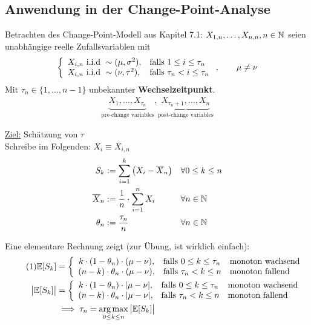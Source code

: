 \subsection{Anwendung in der Change-Point-Analyse} %
Betrachten des Change-Point-Modell aus Kapitel 7.1:
$X_{1,n},\ldots,X_{n,n},n\in\mathbb{N}$ seien unabhängige reelle Zufallsvariablen mit 
\begin{align*}
	\left\lbrace\begin{array}{ll}
		X_{i,n}\text{ i.i.d }\sim(\mu,\sigma^2), &\text{falls } 1\leq i\leq\tau_n\\
		X_{i,n}\text{ i.i.d }\sim(\nu,\tau^2), &\text{falls } \tau_n< i\leq\tau_n\\
	\end{array}\right.,\qquad\mu\neq\nu
\end{align*}
Mit $\tau_n\in\big\lbrace1,\ldots,n-1\big\rbrace$ unbekannter \textbf{Wechselzeitpunkt}.
\begin{align*}
	\underbrace{X_1,\ldots,X_{\tau_n}}_{\text{pre-change variables}},\underbrace{X_{\tau_n+1},\ldots,X_n}_{\text{post-change variables}}
\end{align*}

\underline{Ziel:} Schätzung von $\tau$\\
Schreibe im Folgenden: $X_i\equiv X_{i,n}$
\begin{align*}
	S_k&:=\sum\limits_{i=1}^k\big(X_i-\overline{X}_n\big) &\forall& 0\leq k\leq n\\
	\overline{X}_n&:=\frac{1}{n}\cdot\sum\limits_{i=1}^n X_i &\forall& n\in\mathbb{N}\\
	\theta_n&:=\frac{\tau_n}{n} &\forall& n\in\mathbb{N}
\end{align*}

Eine elementare Rechnung zeigt (zur Übung, ist wirklich  einfach):
\begin{align}\label{eqUnder8.2_1}\tag{1}
	\mathbb{E}[S_k]
	&=\left\lbrace\begin{array}{cll}
		k\cdot(1-\theta_n)\cdot(\mu-\nu), &\text{falls } 0\leq k\leq\tau_n &\text{monoton wachsend}\\
		(n-k)\cdot\theta_n\cdot(\mu-\nu), &\text{falls }\tau_n<k\leq n &\text{monoton fallend}
	\end{array}\right.\\\nonumber
	\big|\mathbb{E}[S_k]\big|
	&=\left\lbrace\begin{array}{cll}
		k\cdot(1-\theta_n)\cdot|\mu-\nu|, &\text{falls } 0\leq k\leq\tau_n &\text{monoton wachsend}\\
		(n-k)\cdot\theta_n\cdot|\mu-\nu|, &\text{falls }\tau_n<k\leq n &\text{monoton fallend}
	\end{array}\right.\\
	&\implies\tau_n=\operatorname*{arg\,max}\limits_{0\leq k\leq n}\big|\mathbb{E}[S_k]\big|\nonumber
\end{align}

